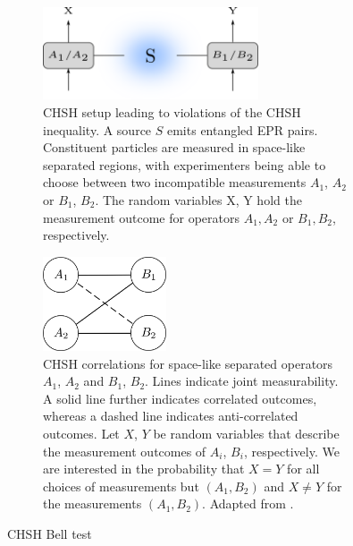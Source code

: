 \begin{figure}
\centering
\begin{subfigure}{\textwidth}
\centering
\includegraphics[width=0.7\textwidth]{images/bell.png}
\caption{CHSH setup leading to violations of the CHSH inequality. A source $S$ emits entangled EPR pairs. Constituent particles are measured in space-like separated regions, with experimenters being able to choose between two incompatible measurements $A_1$, $A_2$ or $B_1$, $B_2$. The random variables X, Y hold the measurement outcome for operators $A_1, A_2$ or $B_1, B_2$, respectively.\\[1em]}
\label{fig:bell}
\end{subfigure}
\begin{subfigure}{\textwidth}
\centering
\includegraphics[width=0.4\textwidth]{images/chsh.png}
\caption{CHSH correlations for space-like separated operators $A_1$, $A_2$ and $B_1$, $B_2$. Lines indicate joint measurability. A solid line further indicates correlated outcomes, whereas a dashed line indicates anti-correlated outcomes. Let $X$, $Y$ be random variables that describe the measurement outcomes of $A_i$, $B_i$, respectively. We are interested in the probability that $X=Y$ for all choices of measurements but $(A_1,B_2)$ and $X\neq Y$ for the measurements $(A_1,B_2)$. Adapted from \cite{Spekkens2012}.\\[1em]}
\label{fig:chsh}
\end{subfigure}
\caption{CHSH Bell test}
\label{fig:chshbelltest}
\end{figure}

